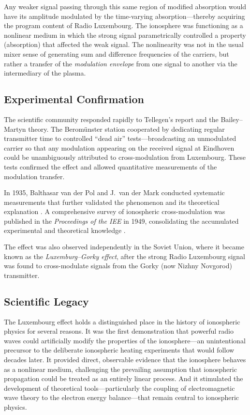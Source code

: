 \documentclass[12pt]{article}
\begin{document}
Any weaker signal passing through this same region of modified absorption would have its
amplitude modulated by the time-varying absorption---thereby acquiring the program content
of Radio Luxembourg.  The ionosphere was functioning as a nonlinear medium in which the
strong signal parametrically controlled a property (absorption) that affected the weak
signal.  The nonlinearity was not in the usual mixer sense of generating sum and difference
frequencies of the carriers, but rather a transfer of the \emph{modulation envelope} from
one signal to another via the intermediary of the plasma.

\subsection{Experimental Confirmation}

The scientific community responded rapidly to Tellegen's report and the Bailey--Martyn
theory.  The Berom\"unster station cooperated by dedicating regular transmitter time to
controlled ``dead air'' tests---broadcasting an unmodulated carrier so that any modulation
appearing on the received signal at Eindhoven could be unambiguously attributed to
cross-modulation from Luxembourg.  These tests confirmed the effect and allowed
quantitative measurements of the modulation transfer.

In 1935, Balthasar van der Pol and J.\ van der Mark conducted systematic measurements
that further validated the phenomenon and its theoretical explanation \cite{vanderpol1935}.
A comprehensive survey of ionospheric cross-modulation was published in the \emph{Proceedings
of the IEE} in 1949, consolidating the accumulated experimental and theoretical knowledge
\cite{ratcliffe1949}.

The effect was also observed independently in the Soviet Union, where it became known as
the \emph{Luxemburg--Gorky effect}, after the strong Radio Luxembourg signal was found to
cross-modulate signals from the Gorky (now Nizhny Novgorod) transmitter.

\subsection{Scientific Legacy}

The Luxembourg effect holds a distinguished place in the history of ionospheric physics for
several reasons.  It was the first demonstration that powerful radio waves could
artificially modify the properties of the ionosphere---an unintentional precursor to the
deliberate ionospheric heating experiments that would follow decades later.  It provided
direct, observable evidence that the ionosphere behaves as a nonlinear medium, challenging
the prevailing assumption that ionospheric propagation could be treated as an entirely
linear process.  And it stimulated the development of theoretical tools---particularly the
coupling of electromagnetic wave theory to the electron energy balance---that remain
central to ionospheric physics.
\end{document}
